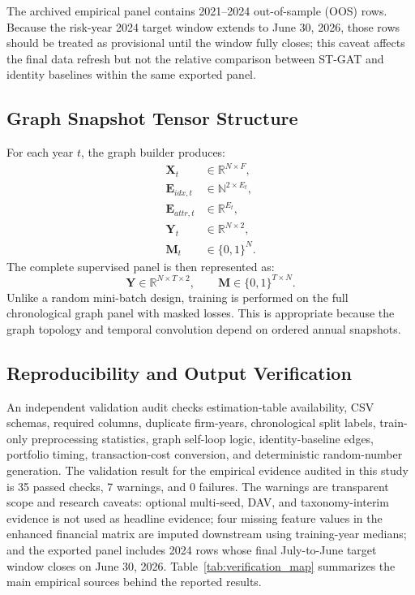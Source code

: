 \documentclass[11pt, a4paper]{article}
\begin{document}
The archived empirical panel contains 2021--2024 out-of-sample (OOS) rows. Because the risk-year 2024 target window extends to June 30, 2026, those rows should be treated as provisional until the window fully closes; this caveat affects the final data refresh but not the relative comparison between ST-GAT and identity baselines within the same exported panel.

\subsection{Graph Snapshot Tensor Structure}
For each year $t$, the graph builder produces:
\begin{align}
\mathbf{X}_t &\in \mathbb{R}^{N \times F},\\
\mathbf{E}_{idx, t} &\in \mathbb{N}^{2 \times E_t},\\
\mathbf{E}_{attr, t} &\in \mathbb{R}^{E_t},\\
\mathbf{Y}_t &\in \mathbb{R}^{N \times 2},\\
\mathbf{M}_t &\in \{0,1\}^{N}.
\end{align}
The complete supervised panel is then represented as:
\begin{equation}
\mathbf{Y} \in \mathbb{R}^{N \times T \times 2},\qquad \mathbf{M} \in \{0,1\}^{T \times N}.
\end{equation}
Unlike a random mini-batch design, training is performed on the full chronological graph panel with masked losses. This is appropriate because the graph topology and temporal convolution depend on ordered annual snapshots.

\subsection{Reproducibility and Output Verification}
An independent validation audit checks estimation-table availability, CSV schemas, required columns, duplicate firm-years, chronological split labels, train-only preprocessing statistics, graph self-loop logic, identity-baseline edges, portfolio timing, transaction-cost conversion, and deterministic random-number generation. The validation result for the empirical evidence audited in this study is 35 passed checks, 7 warnings, and 0 failures. The warnings are transparent scope and research caveats: optional multi-seed, DAV, and taxonomy-interim evidence is not used as headline evidence; four missing feature values in the enhanced financial matrix are imputed downstream using training-year medians; and the exported panel includes 2024 rows whose final July-to-June target window closes on June 30, 2026. Table~\ref{tab:verification_map} summarizes the main empirical sources behind the reported results.
\end{document}
